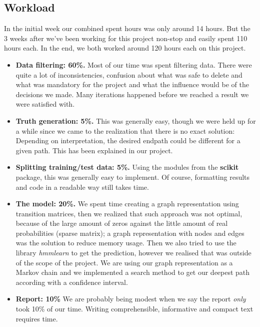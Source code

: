 \begin{appendices}

\section{Workload}\label{app:work}

In the initial week our combined spent hours was only around 14 hours. But the 3 weeks after we've been working for this project non-stop and easily spent 110 hours each. In the end, we both worked around 120 hours each on this project.
\begin{itemize}
	\item \textbf{Data filtering: 60\%.} Most of our time was spent filtering data. There were quite a lot of inconsistencies, confusion about what was safe to delete and what was mandatory for the project and what the influence would be of the decisions we made. Many iterations happened before we reached a result we were satisfied with.
	\item \textbf{Truth generation: 5\%.} This was generally easy, though we were held up for a while since we came to the realization that there is no exact solution: Depending on interpretation, the desired endpath could be different for a given path. This has been explained in our project.
	\item \textbf{Splitting training/test data: 5\%.} Using the modules from the \textbf{scikit} package, this was generally easy to implement. Of course, formatting results and code in a readable way still takes time.
	\item \textbf{The model: 20\%.} We spent time creating a graph representation using transition matrices, then we realized that such approach was not optimal, because of the large amount of zeros against the little amount of real probabilities (sparse matrix); a graph representation with nodes and edges was the solution to reduce memory usage. Then we also tried to use the library \textit{hmmlearn} to get the prediction, however we realised that was outside of the scope of the project. We are using our graph representation as a Markov chain and we implemented a search method to get our deepest path according with a confidence interval.
	\item \textbf{Report: 10\%} We are probably being modest when we say the report \textit{only} took 10\% of our time. Writing comprehensible, informative and compact text requires time.
\end{itemize} 

\end{appendices}
